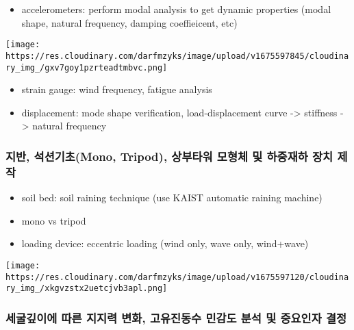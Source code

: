 \documentclass[
  letterpaper,
  DIV=11,
  numbers=noendperiod]{scrreprt}
\providecommand{\tightlist}{%
  \setlength{\itemsep}{0pt}\setlength{\parskip}{0pt}}\usepackage{longtable,booktabs,array}
\begin{document}
\begin{itemize}
\tightlist
\item
  accelerometers: perform modal analysis to get dynamic properties
  (modal shape, natural frequency, damping coeffieicent, etc)
\end{itemize}

\texttt{[image: https://res.cloudinary.com/darfmzyks/image/upload/v1675597845/cloudinary\_img\_/gxv7goy1pzrteadtmbvc.png]}

\begin{itemize}
\item
  strain gauge: wind frequency, fatigue analysis
\item
  displacement: mode shape verification, load-displacement curve
  -\textgreater{} stiffness -\textgreater{} natural frequency
\end{itemize}

\hypertarget{uxc9c0uxbc18-uxc11duxc158uxae30uxcd08mono-tripod-uxc0c1uxbd80uxd0c0uxc6cc-uxbaa8uxd615uxccb4-uxbc0f-uxd558uxc911uxc7acuxd558-uxc7a5uxce58-uxc81cuxc791}{%
\subsubsection{지반, 석션기초(Mono, Tripod), 상부타워 모형체 및 하중재하
장치
제작}\label{uxc9c0uxbc18-uxc11duxc158uxae30uxcd08mono-tripod-uxc0c1uxbd80uxd0c0uxc6cc-uxbaa8uxd615uxccb4-uxbc0f-uxd558uxc911uxc7acuxd558-uxc7a5uxce58-uxc81cuxc791}}

\begin{itemize}
\item
  soil bed: soil raining technique (use KAIST automatic raining machine)
\item
  mono vs tripod
\item
  loading device: eccentric loading (wind only, wave only, wind+wave)
\end{itemize}

\texttt{[image: https://res.cloudinary.com/darfmzyks/image/upload/v1675597120/cloudinary\_img\_/xkgvzstx2uetcjvb3apl.png]}

\hypertarget{uxc138uxad74uxae4auxc774uxc5d0-uxb530uxb978-uxc9c0uxc9c0uxb825-uxbcc0uxd654-uxace0uxc720uxc9c4uxb3d9uxc218-uxbbfcuxac10uxb3c4-uxbd84uxc11d-uxbc0f-uxc911uxc694uxc778uxc790-uxacb0uxc815}{%
\subsubsection{세굴깊이에 따른 지지력 변화, 고유진동수 민감도 분석 및
중요인자
결정}\label{uxc138uxad74uxae4auxc774uxc5d0-uxb530uxb978-uxc9c0uxc9c0uxb825-uxbcc0uxd654-uxace0uxc720uxc9c4uxb3d9uxc218-uxbbfcuxac10uxb3c4-uxbd84uxc11d-uxbc0f-uxc911uxc694uxc778uxc790-uxacb0uxc815}}
\end{document}

